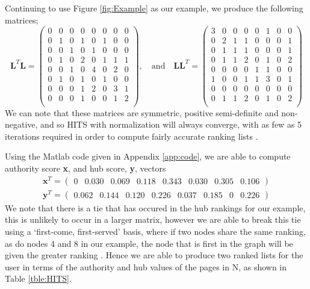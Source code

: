 \documentclass[11pt]{report}
\begin{document}
Continuing to use Figure \ref{fig:Example} as our example, we produce the following matrices;
\begin{equation*}
\textbf{L}^T\textbf{L}=\left(
\begin{array}{cccccccc}
0 & 0 & 0 & 0 & 0 & 0 & 0 & 0 \\
0 & 1 & 0 & 1 & 0 & 1 & 0 & 0 \\
0 & 0 & 1 & 0 & 1 & 0 & 0 & 0 \\
0 & 1 & 0 & 2 & 0 & 1 & 1 & 1 \\
0 & 0 & 1 & 0 & 4 & 0 & 2 & 0 \\
0 & 1 & 0 & 1 & 0 & 1 & 0 & 0 \\
0 & 0 & 0 & 1 & 2 & 0 & 3 & 1 \\
0 & 0 & 0 & 1 & 0 & 0 & 1 & 2 \\
\end{array}
\right)
\mathrm{,}\quad\mathrm{and}\quad
\textbf{LL}^T=\left(
\begin{array}{cccccccc}
3 & 0 & 0 & 0 & 0 & 1 & 0 & 0 \\
0 & 2 & 1 & 1 & 0 & 0 & 0 & 1 \\
0 & 1 & 1 & 1 & 0 & 0 & 0 & 1 \\
0 & 1 & 1 & 2 & 0 & 1 & 0 & 2 \\
0 & 0 & 0 & 0 & 1 & 1 & 0 & 0 \\
1 & 0 & 0 & 1 & 1 & 3 & 0 & 1 \\
0 & 0 & 0 & 0 & 0 & 0 & 0 & 0 \\
0 & 1 & 1 & 2 & 0 & 1 & 0 & 2 \\
\end{array}
\right)
\end{equation*} We can note that these matrices are symmetric, positive semi-definite and non-negative, and so HITS with normalization will always converge, with as few as 5 iterations required in order to compute fairly accurate ranking lists \cite{manning}. 

Using the Matlab code given in Appendix \ref{app:code}, we are able to compute authority score \textbf{x}, and hub score, \textbf{y}, vectors
\begin{eqnarray*}
\textbf{x}^T = \left( \begin{array} {cccccccc}
0 & 0.030 & 0.069 & 0.118 & 0.343 &0.030 &0.305 &0.106
\end{array}\right) \\
\textbf{y}^T = \left( \begin{array} {cccccccc}
0.062 & 0.144 & 0.120 & 0.226 & 0.037 & 0.185 & 0 & 0.226
\end{array}\right)
\end{eqnarray*} We note that there is a tie that has occured in the hub rankings for our example, this is unlikely to occur in a larger matrix, however we are able to break this tie using a `first-come, first-served' basis, where if two nodes share the same ranking, as do nodes 4 and 8 in our example, the node that is first in the graph will be given the greater ranking \cite{langville}. Hence we are able to produce two ranked lists for the user in terms of the authority and hub values of the pages in N, as shown in Table \ref{tble:HITS}.
\end{document}
